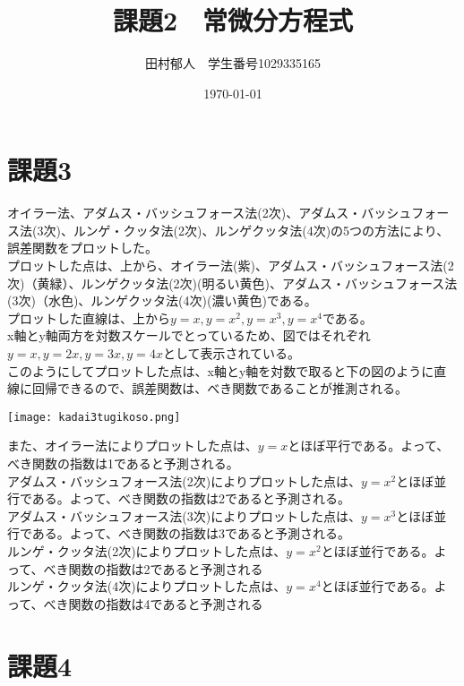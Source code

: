 \documentclass{jarticle}
\title{課題2　常微分方程式}
\author{田村郁人　学生番号1029335165}
\date{\today}
\begin{document}
\maketitle

\section{課題3}
オイラー法、アダムス・バッシュフォース法(2次)、アダムス・バッシュフォース法(3次)、ルンゲ・クッタ法(2次)、ルンゲクッタ法(4次)の5つの方法により、誤差関数をプロットした。\\

プロットした点は、上から、オイラー法(紫)、アダムス・バッシュフォース法(2次)（黄緑）、ルンゲクッタ法(2次)(明るい黄色)、アダムス・バッシュフォース法(3次)（水色)、ルンゲクッタ法(4次)(濃い黄色)である。\\

プロットした直線は、上から$y=x,y=x^2,y=x^3,y=x^4$である。\\x軸とy軸両方を対数スケールでとっているため、図ではそれぞれ$y=x,y=2x, y=3x,y=4x$として表示されている。\\



このようにしてプロットした点は、x軸とy軸を対数で取ると下の図のように直線に回帰できるので、誤差関数は、べき関数であることが推測される。\\


\begin{center}

 \texttt{[image: kadai3tugikoso.png]}

\end{center}

また、オイラー法によりプロットした点は、$y=x$とほぼ平行である。よって、べき関数の指数は1であると予測される。
\\
アダムス・バッシュフォース法(2次)によりプロットした点は、$y=x^2$とほぼ並行である。よって、べき関数の指数は2であると予測される。\\
アダムス・バッシュフォース法(3次)によりプロットした点は、$y=x^3$とほぼ並行である。よって、べき関数の指数は3であると予測される。\\
ルンゲ・クッタ法(2次)によりプロットした点は、$y=x^2$とほぼ並行である。よって、べき関数の指数は2であると予測される\\
ルンゲ・クッタ法(4次)によりプロットした点は、$y=x^4$とほぼ並行である。よって、べき関数の指数は4であると予測される\\


\section{課題4}
\end{document}
